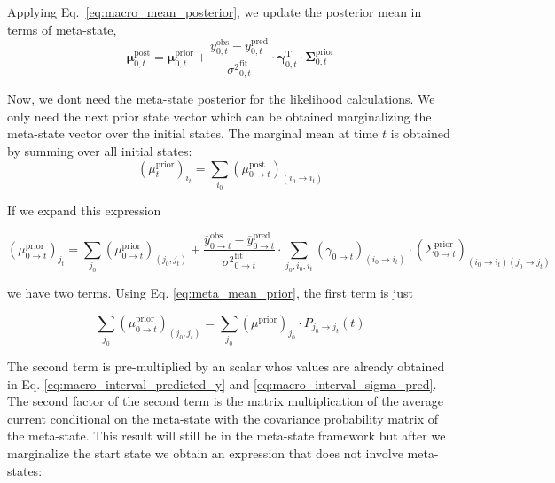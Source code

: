 \documentclass[pdflatex,sn-mathphys-num]{sn-jnl}%
\theoremstyle{thmstyleone}%
\theoremstyle{thmstyletwo}%
\theoremstyle{thmstylethree}%
\begin{document}
Applying Eq.~\ref{eq:macro_mean_posterior}, we update the posterior mean in terms of meta-state,
\begin{equation}
	\mathbf{\mu}^{\mathrm{post}}_{0, t} = \mathbf{\mu}^{\mathrm{prior}}_{0, t} + 
	\frac{y^{\mathrm{obs}}_{0, t} - y^{\mathrm{pred}}_{0, t}}{{\sigma^2}^{\mathrm{fit}}_{0, t}} 
	\cdot \mathbf{\gamma}^{\mathrm{T}}_{0, t} \cdot \mathbf{\Sigma}^{\mathrm{prior}}_{0, t}
	\label{eq:meta_posterior_mean_update}
\end{equation}

Now, we dont need the meta-state posterior for the likelihood calculations. We only need the next prior state vector which can be obtained marginalizing the meta-state vector over the initial states. The marginal mean at time \( t \) is obtained by summing over all initial states:
\begin{equation}
	(\mu^{\mathrm{prior}}_{t})_{i_t} = \sum_{i_0} (\mu^{\mathrm{post}}_{0 \rightarrow t})_{(i_0 \rightarrow i_t)}
	\label{eq:marginal_prior_mean}
\end{equation}

If we expand this expression

\begin{equation}
	(\mu^{\mathrm{prior}}_{0 \rightarrow t})_{j_{t}} = 
	\sum_{j_0} (\mu^{\mathrm{prior}}_{0 \rightarrow t})_{(j_0, j_{t})} 
	+ \frac{\overline{y}^{\mathrm{obs}}_{0 \rightarrow t} - \overline{y}^{\mathrm{pred}}_{0 \rightarrow t}}{{\sigma^2}^{\mathrm{fit}}_{0 \rightarrow t}} \cdot 
	\sum_{j_0, i_0, i_{t}} (\gamma_{0 \rightarrow t})_{(i_0 \rightarrow i_{t})} \cdot (\Sigma^{\mathrm{prior}}_{0 \rightarrow t})_{(i_0 \rightarrow i_{t})(j_0 \rightarrow j_{t})}
	\label{eq:mu_prior_update_0_to_t}
\end{equation}


we have two terms. Using Eq. \ref{eq:meta_mean_prior}, the first term is just

\begin{equation}
	\sum_{j_0} (\mu^{\mathrm{prior}}_{0 \rightarrow t})_{(j_0, j_{t})}= \sum_{j_0} (\mu^{\text{prior}})_{j_0} \cdot P_{j_0 \rightarrow j_t}(t)
	\label{eq:mu_prior_update_0_to_t}
\end{equation}

The second term is pre-multiplied by an scalar whos values are already obtained in Eq. \ref{eq:macro_interval_predicted_y} and \ref{eq:macro_interval_sigma_pred}. The second factor of the second term is the matrix multiplication of the average current conditional on the meta-state with the covariance probability matrix of the meta-state. 
This result will still be in the meta-state framework but after we marginalize the start state we obtain an expression that does not involve meta-states: 
\end{document}
